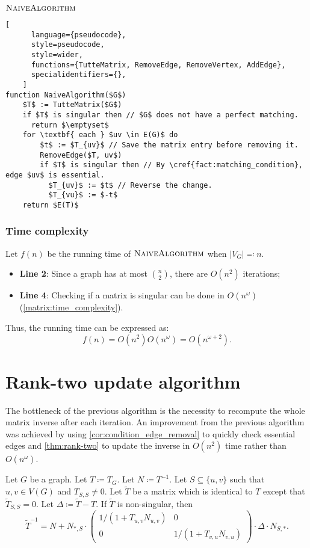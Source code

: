 \begin{programruledcaption}{\(\textsc{NaiveAlgorithm}\)}
    \label{alg:simple}
    \begin{lstlisting}[
      language={pseudocode},
      style=pseudocode,
      style=wider,
      functions={TutteMatrix, RemoveEdge, RemoveVertex, AddEdge},
      specialidentifiers={},
    ]
function NaiveAlgorithm($G$)
    $T$ := TutteMatrix($G$)
    if $T$ is singular then // $G$ does not have a perfect matching.
      return $\emptyset$
    for \textbf{ each } $uv \in E(G)$ do
        $t$ := $T_{uv}$ // Save the matrix entry before removing it.
        RemoveEdge($T, uv$) 
        if $T$ is singular then // By \cref{fact:matching_condition}, edge $uv$ is essential.
          $T_{uv}$ := $t$ // Reverse the change.
          $T_{vu}$ := $-t$
    return $E(T)$
    \end{lstlisting}
\end{programruledcaption}

\subsubsection{Time complexity}
\noindent
Let \(f(n)\) be the running time of \(\textsc{NaiveAlgorithm}\) when \(|V_G| \eqcolon n\).
\begin{itemize}
    \item \textbf{Line 2}: Since a graph has at most \(\binom{n}{2}\), there are \(O(n^2)\) iterations;
    \item \textbf{Line 4}: Checking if a matrix is singular can be done in \(O(n^\omega)\) (\cref{matrix:time_complexity}).
\end{itemize}
Thus, the running time can be expressed as:
\[
    f(n) = O(n^2) O(n^\omega) = O(n^{\omega+2}).
\]

\section{Rank-two update algorithm}

The bottleneck of the previous algorithm is the necessity to recompute the whole matrix inverse after each iteration.
An improvement from the previous algorithm was achieved by using \cref{cor:condition_edge_removal} to quickly check essential edges and \cref{thm:rank-two} to update the inverse in \(O(n^2)\) time rather than \(O(n^\omega)\).

\begin{theorem}
\label{thm:rank-two}
    Let \(G\) be a graph. 
    Let \(T \coloneqq T_G\). 
    Let \(N \coloneqq T^{-1}\).
    Let \(S \subseteq \{u, v\}\) such that \(u, v \in V(G)\) and \(T_{S, S} \neq 0\).
    Let \(\tilde{T}\) be a matrix which is identical to \(T\) except that \(\tilde{T}_{S, S} = 0\).
    Let \(\Delta \coloneqq \tilde{T} - T\).
    If \(\tilde{T}\) is non-singular, then
    \[
        \tilde{T}^{-1} = N + N_{*, S} \cdot 
        \begin{pmatrix}
            1 / (1 + T_{u, v}N_{u, v}) & 0 \\
            0 &  1 / (1 + T_{v, u}N_{v, u})
        \end{pmatrix}
        \cdot \Delta \cdot N_{S, *}.
    \]
\end{theorem}

